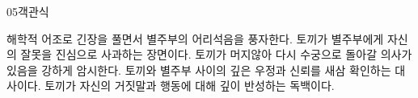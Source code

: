 \documentclass[fs85,seriesWit]{korfarm-base}
\begin{document}
\begin{kfQBlock}{05}{객관식}
\begin{kfChoices}
\kfChoice 해학적 어조로 긴장을 풀면서 별주부의 어리석음을 풍자한다.
\kfChoice 토끼가 별주부에게 자신의 잘못을 진심으로 사과하는 장면이다.
\kfChoice 토끼가 머지않아 다시 수궁으로 돌아갈 의사가 있음을 강하게 암시한다.
\kfChoice 토끼와 별주부 사이의 깊은 우정과 신뢰를 새삼 확인하는 대사이다.
\kfChoice 토끼가 자신의 거짓말과 행동에 대해 깊이 반성하는 독백이다.
\end{kfChoices}
\end{kfQBlock}

\kfEndMC

\end{document}
